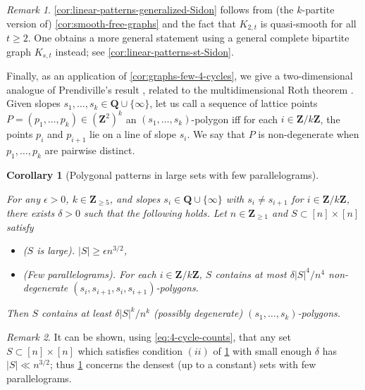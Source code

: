 \documentclass[reqno,11pt]{amsart}
\newtheorem{corollary}[theorem]{Corollary}
\theoremstyle{definition}
\theoremstyle{remark}
\newtheorem*{remark}{Remark}
\numberwithin{equation}{section}
\newcommand{\Z}{\mathbf{Z}}
\newcommand{\Q}{\mathbf{Q}}
\begin{document}
\begin{remark}
\cref{cor:linear-patterns-generalized-Sidon} follows from (the $k$-partite version of) \cref{cor:smooth-free-graphs} and the fact that $K_{2,t}$ is quasi-smooth for all $t \ge 2$. One obtains a more general statement using a general complete bipartite graph $K_{s,t}$ instead; see \cref{cor:linear-patterns-st-Sidon}. 
\end{remark}

Finally, as an application of \cref{cor:graphs-few-4-cycles}, we give a two-dimensional analogue of Prendiville's result \cite{prendiville2022solving}, related to the multidimensional Roth theorem \cite{solymosi2003note,solymosi2004note,gowers2007hypergraph}. Given slopes $s_1, \ldots, s_k \in \Q \cup \{\infty\}$, let us call a sequence of lattice points $P = (p_1, \ldots, p_k) \in (\Z^2)^k$ an $(s_1, \ldots, s_k)$-polygon iff for each $i \in \Z/k\Z$, the points $p_i$ and $p_{i+1}$ lie on a line of slope $s_i$. We say that $P$ is non-degenerate when $p_1, \ldots, p_k$ are pairwise distinct.

\begin{corollary}[Polygonal patterns in large sets with few parallelograms] \label{cor:polygonal-patterns}

For any $\epsilon > 0$, $k \in \Z_{\ge 5}$, and slopes $s_i \in \Q \cup \{\infty\}$ with $s_i \neq s_{i+1}$ for $i \in \Z/k\Z$, there exists $\delta > 0$ such that the following holds. Let $n \in \Z_{\ge 1}$ and $S \subset [n] \times [n]$ satisfy
\begin{itemize}
    \item[$(i)$] \emph{($S$ is large).} $|S| \ge \epsilon n^{3/2}$,
    \item[$(ii)$] \emph{(Few parallelograms).} For each $i \in \Z/k\Z$, $S$ contains at most $\delta |S|^4/n^4$ non-degenerate $(s_i, s_{i+1}, s_i, s_{i+1})$-polygons.
\end{itemize}
Then $S$ contains at least $\delta |S|^k / n^k$ (possibly degenerate) $(s_1, \ldots, s_k)$-polygons.
\end{corollary}

\begin{remark}
It can be shown, using \cref{eq:4-cycle-counts}, that any set $S \subset [n] \times [n]$ which satisfies condition $(ii)$ of \cref{cor:polygonal-patterns} with small enough $\delta$ has $|S| \ll n^{3/2}$; thus \cref{cor:polygonal-patterns} concerns the densest (up to a constant) sets with few parallelograms.
\end{remark}
\end{document}
